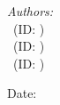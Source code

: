 \begin{titlepage}
\vspace{1.5cm}
\begin{flushleft} \large
\textit{Authors:}\\
\reportauthorOne ~(ID: \cidOne) \\
\reportauthorTwo ~(ID: \cidTwo)\\   %
\reportauthorThree ~(ID: \cidThree)
\end{flushleft}
\vspace{3.5cm}
\makeatletter
Date: \@date 

\vfill %



\makeatother


\end{titlepage}

